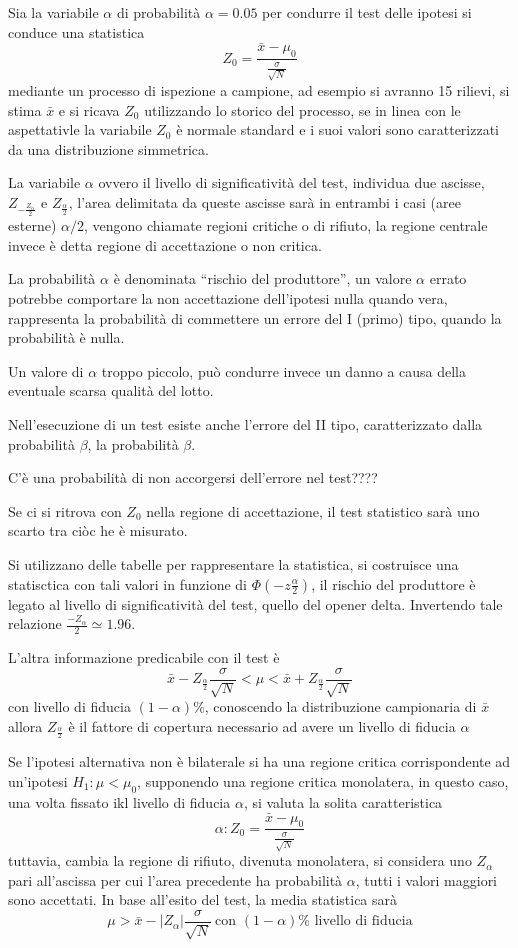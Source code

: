 Sia la variabile $\alpha$ di probabilità $\alpha = 0.05$ per condurre il test delle ipotesi si conduce una statistica
$$
Z_0 = \frac{\bar{x} - \mu_0}{\frac{\sigma}{\sqrt{N}}}
$$
mediante un processo di ispezione a campione, ad esempio si avranno 15 rilievi, si stima $\bar{x}$ e si ricava $Z_0$ utilizzando lo storico del processo, se in linea con le aspettativle la variabile $Z_0$ è normale standard e i suoi valori sono caratterizzati da una distribuzione simmetrica.

La variabile $\alpha$ ovvero il livello di significatività del test, 
individua due ascisse, $Z_{-\frac{Z_\alpha}{2}}$ e $Z_{\frac{\alpha}{2}}$, 
l'area delimitata da queste ascisse sarà in entrambi i casi (aree esterne) 
$\alpha/2$, vengono chiamate regioni critiche o di rifiuto, la regione centrale 
invece è detta regione di accettazione o non critica.

La probabilità $\alpha$ è denominata ``rischio del produttore'', un valore 
$\alpha$ errato potrebbe comportare la non accettazione dell'ipotesi nulla 
quando vera, rappresenta la probabilità di commettere un errore del I (primo) tipo, 
quando la probabilità è nulla. 

Un valore di $\alpha$ troppo piccolo, può condurre invece un danno a causa della eventuale scarsa qualità del lotto.

Nell'esecuzione di un test esiste anche l'errore del II tipo, caratterizzato dalla probabilità $\beta$, la probabilità $\beta$.

C'è una probabilità di non accorgersi dell'errore nel test????

Se ci si ritrova con $Z_0$ nella regione di accettazione, il test statistico sarà uno scarto tra ciòc he è misurato.

Si utilizzano delle tabelle per rappresentare la statistica, si costruisce una 
statisctica con tali valori in funzione di $\Phi(-z\frac{\alpha}{2})$, il 
rischio del produttore è legato al livello di significatività del test, quello 
del opener delta. Invertendo tale relazione $\frac{-Z_\alpha}{2}\simeq 1.96$.

L'altra informazione predicabile con il test è
$$
\bar{x} - Z_\frac{\alpha}{2}\frac{\sigma}{\sqrt{N}}<\mu < \bar{x} + Z_\frac{\alpha}{2}\frac{\sigma}{\sqrt{N}}
$$
con livello di fiducia $(1-\alpha)\%$, conoscendo la distribuzione campionaria di $\bar{x}$ allora $Z_\frac{\alpha}{2}$ è il fattore di copertura necessario ad avere un livello di fiducia $\alpha$

Se l'ipotesi alternativa non è bilaterale si ha una regione critica corrispondente ad un'ipotesi $H_1: \mu<\mu_0$, supponendo una regione critica monolatera, in questo caso, una volta fissato ikl livello di fiducia $\alpha$, si valuta la solita caratteristica 
$$
\alpha:Z_0=\frac{\bar{x} - \mu_0}{\frac{\sigma}{\sqrt{N}}}
$$
tuttavia, cambia la regione di rifiuto, divenuta monolatera, si considera uno $Z_\alpha$ pari all'ascissa per cui l'area precedente ha probabilità $\alpha$, tutti i valori maggiori sono accettati.
In base all'esito del test, la media statistica sarà
$$
\mu > \bar{x} - |Z_\alpha|\frac{\sigma}{\sqrt{N}}\ \text{con } (1-\alpha)\%\text{ livello di fiducia}
$$


